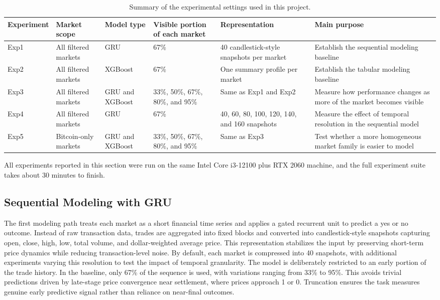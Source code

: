 \documentclass[11pt]{article}
\begin{document}
\begin{table}[ht!]
\centering
\caption{Summary of the experimental settings used in this project.}
\label{tab:experiment_settings}
\small
\begin{tabularx}{\textwidth}{@{}l l l l Y Y@{}}
\toprule
Experiment & Market scope & Model type & Visible portion of each market & Representation & Main purpose \\
\midrule
Exp1 & All filtered markets & GRU & 67\% & 40 candlestick-style snapshots per market & Establish the sequential modeling baseline \\
Exp2 & All filtered markets & XGBoost & 67\% & One summary profile per market & Establish the tabular modeling baseline \\
Exp3 & All filtered markets & GRU and XGBoost & 33\%, 50\%, 67\%, 80\%, and 95\% & Same as Exp1 and Exp2 & Measure how performance changes as more of the market becomes visible \\
Exp4 & All filtered markets & GRU & 67\% & 40, 60, 80, 100, 120, 140, and 160 snapshots & Measure the effect of temporal resolution in the sequential model \\
Exp5 & Bitcoin-only markets & GRU and XGBoost & 33\%, 50\%, 67\%, 80\%, and 95\% & Same as Exp3 & Test whether a more homogeneous market family is easier to model \\
\bottomrule
\end{tabularx}
\end{table}

All experiments reported in this section were run on the same Intel Core i3-12100 plus RTX 2060 machine, and the full experiment suite takes about 30 minutes to finish.

\subsection{Sequential Modeling with GRU}

The first modeling path treats each market as a short financial time series and applies a gated recurrent unit to predict a yes or no outcome. Instead of raw transaction data, trades are aggregated into fixed blocks and converted into candlestick-style snapshots capturing open, close, high, low, total volume, and dollar-weighted average price. This representation stabilizes the input by preserving short-term price dynamics while reducing transaction-level noise. By default, each market is compressed into 40 snapshots, with additional experiments varying this resolution to test the impact of temporal granularity. The model is deliberately restricted to an early portion of the trade history. In the baseline, only 67\% of the sequence is used, with variations ranging from 33\% to 95\%. This avoids trivial predictions driven by late-stage price convergence near settlement, where prices approach 1 or 0. Truncation ensures the task measures genuine early predictive signal rather than reliance on near-final outcomes.
\end{document}

